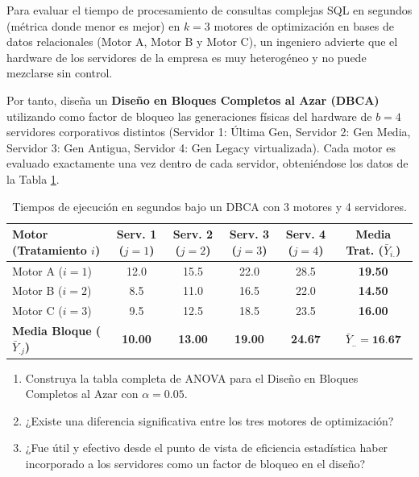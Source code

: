 \begin{problema}
	\label{prob:dbca_servidores}
	Para evaluar el tiempo de procesamiento de consultas complejas SQL en segundos (métrica donde menor es mejor) en $k = 3$ motores de optimización en bases de datos relacionales (Motor A, Motor B y Motor C), un ingeniero advierte que el hardware de los servidores de la empresa es muy heterogéneo y no puede mezclarse sin control. 
	
	Por tanto, diseña un \textbf{Diseño en Bloques Completos al Azar (DBCA)} utilizando como factor de bloqueo las generaciones físicas del hardware de $b = 4$ servidores corporativos distintos (Servidor 1: Última Gen, Servidor 2: Gen Media, Servidor 3: Gen Antigua, Servidor 4: Gen Legacy virtualizada). Cada motor es evaluado exactamente una vez dentro de cada servidor, obteniéndose los datos de la Tabla \ref{tab:dbca_datos}.
	\begin{table}[h!]
		\centering
		\begin{tabular}{lccccc}
			\hline
			\textbf{Motor (Tratamiento $i$)} & \textbf{Serv. 1 ($j=1$)} & \textbf{Serv. 2 ($j=2$)} & \textbf{Serv. 3 ($j=3$)} & \textbf{Serv. 4 ($j=4$)} & \textbf{Media Trat. ($\bar{Y}_{i.}$)} \\ \hline
			Motor A ($i=1$) & 12.0 & 15.5 & 22.0 & 28.5 & \textbf{19.50} \\
			Motor B ($i=2$) & 8.5 & 11.0 & 16.5 & 22.0 & \textbf{14.50} \\
			Motor C ($i=3$) & 9.5 & 12.5 & 18.5 & 23.5 & \textbf{16.00} \\ \hline
			\textbf{Media Bloque ($\bar{Y}_{.j}$)} & \textbf{10.00} & \textbf{13.00} & \textbf{19.00} & \textbf{24.67} & $\bar{Y}_{..} = \textbf{16.67}$ \\ \hline
		\end{tabular}
		\caption{Tiempos de ejecución en segundos bajo un DBCA con 3 motores y 4 servidores.}
		\label{tab:dbca_datos}
	\end{table}
	
	\begin{enumerate}
		\item Construya la tabla completa de ANOVA para el Diseño en Bloques Completos al Azar con $\alpha = 0.05$.
		\item ¿Existe una diferencia significativa entre los tres motores de optimización?
		\item ¿Fue útil y efectivo desde el punto de vista de eficiencia estadística haber incorporado a los servidores como un factor de bloqueo en el diseño?
	\end{enumerate}
\end{problema}

